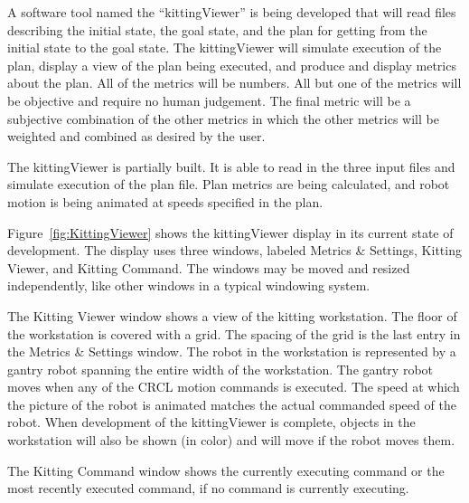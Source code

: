 A software tool named the ``kittingViewer'' is being developed that will
read files describing the initial state, the goal state, and the plan for
getting from the initial state to the goal state. The kittingViewer will
simulate execution of the plan, display a view of the plan being executed,
and produce and display metrics about the plan.  All of the metrics will be
numbers. All but one of the metrics will be objective and require no human
judgement. The final metric will be a subjective combination of the other
metrics in which the other metrics will be weighted and combined as desired
by the user.

The kittingViewer is partially built. It is able to read in the three
input files and simulate execution of the plan file. Plan metrics are
being calculated, and robot motion is being animated at speeds specified
in the plan.

Figure~\ref{fig:KittingViewer} shows the kittingViewer display in its
current state of development. The display uses three windows, labeled
Metrics \& Settings, Kitting Viewer, and Kitting Command. The windows may
be moved and resized independently, like other windows in a typical
windowing system. 

The Kitting Viewer window shows a view of the kitting workstation. The
floor of the workstation is covered with a grid. The spacing of the grid is
the last entry in the Metrics \& Settings window. The robot in the
workstation is represented by a gantry robot spanning the entire width of
the workstation.  The gantry robot moves when any of the CRCL motion
commands is executed.  The speed at which the picture of the robot is
animated matches the actual commanded speed of the robot.  When development
of the kittingViewer is complete, objects in the workstation will also be
shown (in color) and will move if the robot moves them.

The Kitting Command window shows the currently executing command or the
most recently executed command, if no command is currently executing.

